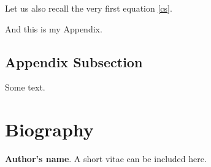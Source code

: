 \documentclass{river-journal}
\begin{document}
Let us also recall the very first equation \ref{cs}.

\appendix

And this is my Appendix.

\subsection*{Appendix Subsection}

Some text.

\nocite{*} %



{}




\section*{Biography}


\medskip
\noindent
{\bf Author's name}. A short vitae can be included here.
\end{document}
